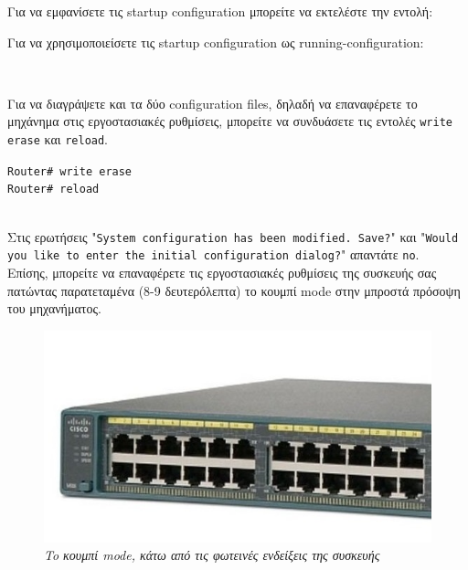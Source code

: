 \documentclass[12pt]{article}
\begin{document}
Για να εμφανίσετε τις startup configuration μπορείτε να εκτελέστε την εντολή: 

\begin{flushleft}
\end{flushleft}

Για να χρησιμοποιείσετε τις startup configuration ως running-configuration: 

\begin{flushleft}
	\\
\end{flushleft}

Για να διαγράψετε και τα δύο configuration files, δηλαδή να επαναφέρετε το μηχάνημα στις εργοστασιακές ρυθμίσεις, μπορείτε να συνδυάσετε τις εντολές \texttt{write erase} και \texttt{reload}.\\

\begin{Sbox}
	\begin{minipage}{4in}
		\texttt{Router\# write erase\\
			Router\# reload}
	\end{minipage}
\end{Sbox}
\fbox{\TheSbox}
\\

Στις ερωτήσεις "\texttt{System configuration has been modified. Save?}" και "\texttt{Would you like to enter the initial configuration dialog?}" απαντάτε \texttt{no}.\\

Επίσης, μπορείτε να επαναφέρετε τις εργοστασιακές ρυθμίσεις της συσκευής σας πατώντας παρατεταμένα (8-9 δευτερόλεπτα) το κουμπί mode στην μπροστά πρόσοψη του μηχανήματος.

\begin{figure}[H]
	\centering
	\includegraphics[scale=0.5]{reset-button.jpg}
	\caption{\textit{To κουμπί mode, κάτω από τις φωτεινές ενδείξεις της συσκευής}}
\end{figure}
\end{document}

